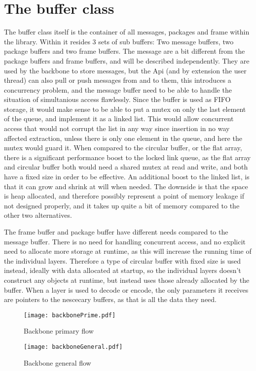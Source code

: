 \section{The buffer class}
The buffer class itself is the container of all messages, packages and frame within the library. Within it resides 3 sets of sub buffers: Two message buffers, two package buffers and two frame buffers. 
The message are a bit different from the package buffers and frame buffers, and will be described independently. They are used by the backbone to store messages, but the Api (and by extension the user thread) can also pull or push messages from and to them, this introduces a concurrency problem, and the message buffer need to be able to handle the situation of simultanious access flawlessly.
Since the buffer is used as FIFO storage, it would make sense to be able to put a mutex on only the last element of the queue, and implement it as a linked list.
This would allow concurrent access that would not corrupt the list in any way since insertion in no way affected extraction, unless there is only one element in the queue, and here the mutex would guard it.
When compared to the circular buffer, or the flat array, there is a significant performance boost to the locked link queue, as the flat array and circular buffer both would need a shared mutex at read and write, and both have a fixed size in order to be effective.
An additional boost to the linked list, is that it can grow and shrink at will when needed. The downside is that the space is heap allocated, and therefore possibly represent a point of memory leakage if not designed properly, and it takes up quite a bit of memory compared to the other two alternatives.

The frame buffer and package buffer have different needs compared to the message buffer. There is no need for handling concurrent access, and no explicit need to allocate more storage at runtime, as this will increase the running time of the individual layers.
Therefore a type of circular buffer with fixed size is used instead, ideally with data allocated at startup, so the individual layers doesn't construct any objects at runtime, but instead uses those already allocated by the buffer.
When a layer is used to decode or encode, the only parameters it receives are pointers to the nescecary buffers, as that is all the data they need.

\begin{figure}[htb]
	\begin{center}
	\texttt{[image: backbonePrime.pdf]}
	\caption{Backbone primary flow}
	\label{fig:backboneprime}	
	\end{center}
\end{figure}

\begin{figure}[htb]
	\begin{center}
	\texttt{[image: backboneGeneral.pdf]}
	\caption{Backbone general flow}
	\label{fig:backbonegeneral}	
	\end{center}
\end{figure}
